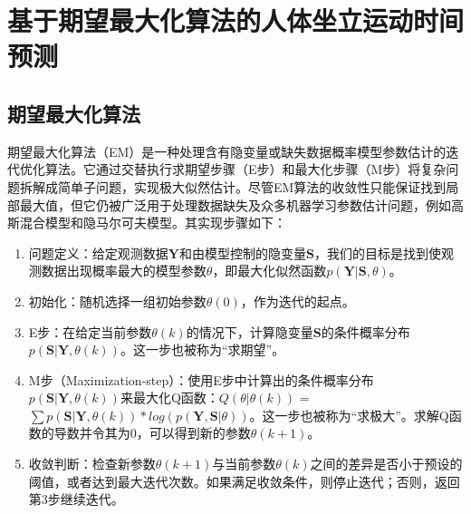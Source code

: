 \section{基于期望最大化算法的人体坐立运动时间预测}
\subsection{期望最大化算法}
期望最大化算法（EM）是一种处理含有隐变量或缺失数据概率模型参数估计的迭代优化算法。它通过交替执行求期望步骤（E步）和最大化步骤（M步）将复杂问题拆解成简单子问题，实现极大似然估计。尽管EM算法的收敛性只能保证找到局部最大值，但它仍被广泛用于处理数据缺失及众多机器学习参数估计问题，例如高斯混合模型和隐马尔可夫模型。其实现步骤如下：

\begin{enumerate}
\item 问题定义：给定观测数据$\mathbf{Y}$和由模型控制的隐变量$\mathbf{S}$，我们的目标是找到使观测数据出现概率最大的模型参数$θ$，即最大化似然函数$p(\mathbf{Y}|\mathbf{S}, θ)$。

\item 初始化：随机选择一组初始参数$θ(0)$，作为迭代的起点。

\item E步：在给定当前参数$θ(k)$的情况下，计算隐变量$\mathbf{S}$的条件概率分布$p(\mathbf{S}|\mathbf{Y}, θ(k))$。这一步也被称为“求期望”。

\item M步（Maximization-step）：使用E步中计算出的条件概率分布$p(\mathbf{S}|\mathbf{Y}, θ(k))$来最大化Q函数：$Q(θ|θ(k))$ = $\sum p(\mathbf{S}|\mathbf{Y}, θ(k)) * log(p(\mathbf{Y}, \mathbf{S}|θ))$。这一步也被称为``求极大''。求解Q函数的导数并令其为0，可以得到新的参数$θ(k+1)$。

\item 收敛判断：检查新参数$θ(k+1)$与当前参数$θ(k)$之间的差异是否小于预设的阈值，或者达到最大迭代次数。如果满足收敛条件，则停止迭代；否则，返回第3步继续迭代。
\end{enumerate}

